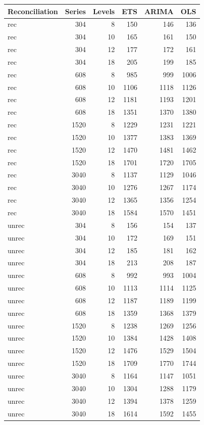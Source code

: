 \documentclass[11pt,a4paper,]{article}
\let\origtable\table
\let\endorigtable\endtable
\renewenvironment{table}[1][2] {
    \expandafter\origtable\expandafter[!htbp]
} {
    \endorigtable
}
\begin{document}
\begin{table}[!h]

\caption{\label{tab:TourismdatasimrollinglevelNS}Mean RMSE on 8, 10, 12 and 18 levels of hierarchy with 304, 608, 1520 and 3040 number of bottom level series for ETS, ARIMA and OLS with and without reconciliation - two years forecast points with 0.5 error value - rolling origin - Simulated tourism dataset}
\centering
\begin{tabular}[t]{lrrrrr}
\toprule
Reconciliation & Series & Levels & ETS & ARIMA & OLS\\
\midrule
rec & 304 & 8 & 150 & 146 & 136\\
rec & 304 & 10 & 165 & 161 & 150\\
rec & 304 & 12 & 177 & 172 & 161\\
rec & 304 & 18 & 205 & 199 & 185\\
rec & 608 & 8 & 985 & 999 & 1006\\
rec & 608 & 10 & 1106 & 1118 & 1126\\
rec & 608 & 12 & 1181 & 1193 & 1201\\
rec & 608 & 18 & 1351 & 1370 & 1380\\
rec & 1520 & 8 & 1229 & 1231 & 1221\\
rec & 1520 & 10 & 1377 & 1383 & 1369\\
rec & 1520 & 12 & 1470 & 1481 & 1462\\
rec & 1520 & 18 & 1701 & 1720 & 1705\\
rec & 3040 & 8 & 1137 & 1129 & 1046\\
rec & 3040 & 10 & 1276 & 1267 & 1174\\
rec & 3040 & 12 & 1365 & 1356 & 1254\\
rec & 3040 & 18 & 1584 & 1570 & 1451\\
unrec & 304 & 8 & 156 & 154 & 137\\
unrec & 304 & 10 & 172 & 169 & 151\\
unrec & 304 & 12 & 185 & 181 & 162\\
unrec & 304 & 18 & 213 & 208 & 187\\
unrec & 608 & 8 & 992 & 993 & 1004\\
unrec & 608 & 10 & 1113 & 1114 & 1125\\
unrec & 608 & 12 & 1187 & 1189 & 1199\\
unrec & 608 & 18 & 1359 & 1368 & 1379\\
unrec & 1520 & 8 & 1238 & 1269 & 1256\\
unrec & 1520 & 10 & 1384 & 1428 & 1408\\
unrec & 1520 & 12 & 1476 & 1529 & 1504\\
unrec & 1520 & 18 & 1709 & 1770 & 1744\\
unrec & 3040 & 8 & 1164 & 1147 & 1051\\
unrec & 3040 & 10 & 1304 & 1288 & 1179\\
unrec & 3040 & 12 & 1394 & 1378 & 1259\\
unrec & 3040 & 18 & 1614 & 1592 & 1455\\
\bottomrule
\end{tabular}
\end{table}
\end{document}
